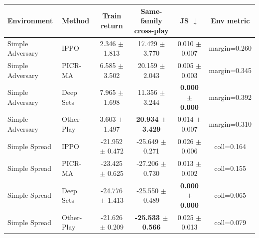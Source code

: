 \begin{tabular}{llcccc}
\toprule
Environment & Method & Train return & Same-family cross-play & JS $\downarrow$ & Env metric \\
\midrule
Simple Adversary & IPPO & 2.346 $\pm$ 1.813 & 17.429 $\pm$ 3.770 & 0.010 $\pm$ 0.007 & margin=0.260 \\
Simple Adversary & PICR-MA & 6.585 $\pm$ 3.502 & 20.159 $\pm$ 2.043 & 0.005 $\pm$ 0.003 & margin=0.345 \\
Simple Adversary & Deep Sets & 7.965 $\pm$ 1.698 & 11.356 $\pm$ 3.244 & \textbf{0.000 $\pm$ 0.000} & margin=0.392 \\
Simple Adversary & Other-Play & 3.603 $\pm$ 1.497 & \textbf{20.934 $\pm$ 3.429} & 0.014 $\pm$ 0.007 & margin=0.310 \\
\midrule
Simple Spread & IPPO & -21.952 $\pm$ 0.472 & -25.649 $\pm$ 0.271 & 0.026 $\pm$ 0.006 & coll=0.164 \\
Simple Spread & PICR-MA & -23.425 $\pm$ 0.625 & -27.206 $\pm$ 0.730 & 0.013 $\pm$ 0.002 & coll=0.155 \\
Simple Spread & Deep Sets & -24.776 $\pm$ 1.413 & -25.550 $\pm$ 0.489 & \textbf{0.000 $\pm$ 0.000} & coll=0.065 \\
Simple Spread & Other-Play & -21.626 $\pm$ 0.209 & \textbf{-25.533 $\pm$ 0.566} & 0.025 $\pm$ 0.013 & coll=0.079 \\
\bottomrule
\end{tabular}
